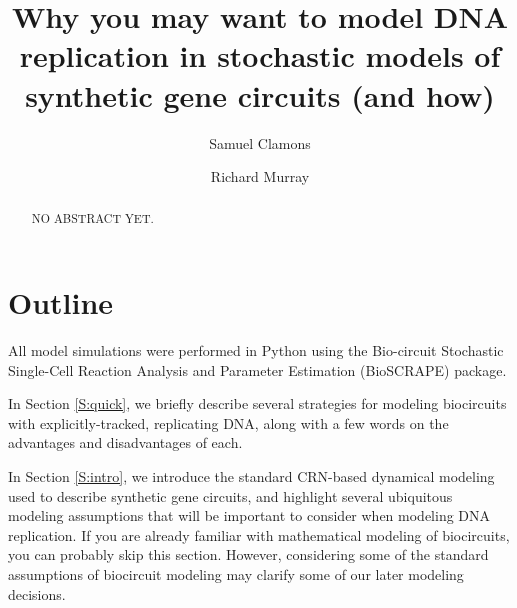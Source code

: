 \documentclass[preprint,12pt]{elsarticle}
\begin{document}
\begin{frontmatter}


\title{Why you may want to model DNA replication in stochastic models of synthetic gene circuits (and how)}




\author{Samuel Clamons}
\author{Richard Murray}

\address{Caltech, Pasadena, CA, United States}


\begin{abstract}
NO ABSTRACT YET.
\end{abstract}

\end{frontmatter}

\section{Outline}
\label{S:outline}

All model simulations were performed in Python using the Bio-circuit Stochastic Single-Cell Reaction Analysis and Parameter Estimation (BioSCRAPE) package. 

In Section \ref{S:quick}, we briefly describe several strategies for modeling biocircuits with explicitly-tracked, replicating DNA, along with a few words on the advantages and disadvantages of each. 

In Section \ref{S:intro}, we introduce the standard CRN-based dynamical modeling used to describe synthetic gene circuits, and highlight several ubiquitous modeling assumptions that will be important to consider when modeling DNA replication. If you are already familiar with mathematical modeling of biocircuits, you can probably skip this section. However, considering some of the standard assumptions of biocircuit modeling may clarify some of our later modeling decisions.
\end{document}
